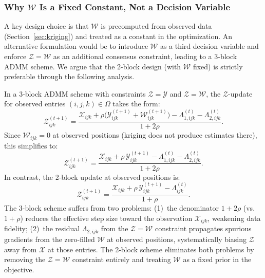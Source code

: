 \documentclass[journal]{IEEEtran}
\newcommand{\Xcal}{\mathcal{X}}
\newcommand{\Zcal}{\mathcal{Z}}
\newcommand{\Ycal}{\mathcal{Y}}
\newcommand{\Wcal}{\mathcal{W}}
\newcommand{\Omegaobs}{\Omega}
\begin{document}
\subsubsection{Why $\Wcal$ Is a Fixed Constant, Not a Decision Variable}\label{sec:why_fixed}

A key design choice is that $\Wcal$ is precomputed from observed data (Section~\ref{sec:kriging}) and treated as a constant in the optimization. An alternative formulation would be to introduce $\Wcal$ as a third decision variable and enforce $\Zcal = \Wcal$ as an additional consensus constraint, leading to a 3-block ADMM scheme. We argue that the 2-block design (with $\Wcal$ fixed) is strictly preferable through the following analysis.

\begin{proposition}\label{prop:3block}
In a 3-block ADMM scheme with constraints $\Zcal = \Ycal$ and $\Zcal = \Wcal$, the $\Zcal$-update for observed entries $(i,j,k) \in \Omegaobs$ takes the form:
\begin{equation}\label{eq:Z_obs_3block}
\Zcal_{ijk}^{(t+1)} = \frac{\Xcal_{ijk} + \rho\bigl(\Ycal_{ijk}^{(t+1)} + \Wcal_{ijk}^{(t+1)}\bigr) - \Lambda_{1,ijk}^{(t)} - \Lambda_{2,ijk}^{(t)}}{1 + 2\rho}.
\end{equation}
Since $\Wcal_{ijk} = 0$ at observed positions (kriging does not produce estimates there), this simplifies to:
\begin{equation}\label{eq:Z_obs_3block_simplified}
\Zcal_{ijk}^{(t+1)} = \frac{\Xcal_{ijk} + \rho\,\Ycal_{ijk}^{(t+1)} - \Lambda_{1,ijk}^{(t)} - \Lambda_{2,ijk}^{(t)}}{1 + 2\rho}.
\end{equation}
In contrast, the 2-block update at observed positions is:
\begin{equation}\label{eq:Z_obs_2block}
\Zcal_{ijk}^{(t+1)} = \frac{\Xcal_{ijk} + \rho\,\Ycal_{ijk}^{(t+1)} - \Lambda_{ijk}^{(t)}}{1 + \rho}.
\end{equation}
The 3-block scheme suffers from two problems: (1)~the denominator $1+2\rho$ (vs.\ $1+\rho$) reduces the effective step size toward the observation $\Xcal_{ijk}$, weakening data fidelity; (2)~the residual $\Lambda_{2,ijk}$ from the $\Zcal = \Wcal$ constraint propagates spurious gradients from the zero-filled $\Wcal$ at observed positions, systematically biasing $\Zcal$ away from $\Xcal$ at those entries. The 2-block scheme eliminates both problems by removing the $\Zcal = \Wcal$ constraint entirely and treating $\Wcal$ as a fixed prior in the objective.
\end{proposition}
\end{document}
